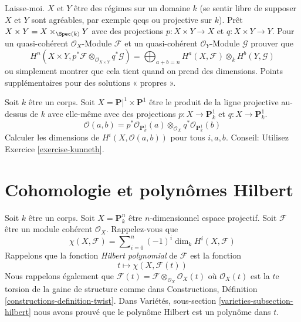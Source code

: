 \begin{exercise}
\label{exercise-kunneth}
Laisse-moi. $X$ et $Y$ être des régimes sur un domaine $k$ (se
sentir libre de supposer $X$ et $Y$ sont agréables, par exemple
qcqs ou projective sur $k$). Prêt $X \times Y = X
\times_{\Spec(k)} Y$ avec des projections $p : X \times Y
\to X$ et $q : X \times Y \to Y$.
Pour un quasi-cohérent $\mathcal{O}_X$-Module $\mathcal{F}$ et un quasi-cohérent $\mathcal{O}_Y$-Module $\mathcal{G}$ prouver que
$$
H^n(X \times Y,
p^*\mathcal{F} \otimes_{\mathcal{O}_{X \times Y}} q^*\mathcal{G}) =
\bigoplus\nolimits_{a + b = n}
H^a(X, \mathcal{F}) \otimes_k H^b(Y, \mathcal{G})
$$
ou simplement montrer que cela tient quand on prend des dimensions.
Points supplémentaires pour des solutions « propres ».
\end{exercise}

\begin{exercise}
\label{exercise-Oab}
Soit $k$ être un corps. Soit $X = \mathbf{P}|^1 \times \mathbf{P}^1$ être
le produit de la ligne projective au-dessus de $k$ avec
elle-même avec des projections $p : X \to \mathbf{P}^1_k$ et $q : X \to
\mathbf{P}^1_k$.
$$
\mathcal{O}(a, b) = p^*\mathcal{O}_{\mathbf{P}^1_k}(a)
\otimes_{\mathcal{O}_X} q^*\mathcal{O}_{\mathbf{P}^1_k}(b)
$$
Calculer les dimensions de $H^i(X, \mathcal{O}(a, b))$
pour tous $i, a, b$. Conseil: Utilisez Exercice \ref{exercise-kunneth}.
\end{exercise}










\section{Cohomologie et polynômes Hilbert}
\label{section-cohomology-hilbert-polynomials}

\begin{situation}
\label{situation-hilbert-polynomial}
Soit $k$ être un corps. Soit $X
= \mathbf{P}^n_k$ être $n$-dimensionnel espace projectif. Soit $\mathcal{F}$
être un module cohérent $\mathcal{O}_X$. Rappelez-vous que
$$
\chi(X, \mathcal{F}) =
\sum\nolimits_{i = 0}^n (-1)^i \dim_k H^i(X, \mathcal{F})
$$
Rappelons que la fonction {\it Hilbert polynomial} de $\mathcal{F}$ est la fonction
$$
t \longmapsto \chi(X, \mathcal{F}(t))
$$
Nous rappelons
également que $\mathcal{F}(t) = \mathcal{F} \otimes_{\mathcal{O}_X} \mathcal{O}_X(t)$ où $\mathcal{O}_X(t)$
est la $t$e torsion de la gaine de
structure comme dans Constructions, Définition \ref{constructions-definition-twist}. Dans Variétés,
sous-section \ref{varieties-subsection-hilbert} nous avons prouvé que le polynôme
Hilbert est un polynôme dans $t$.
\end{situation}

